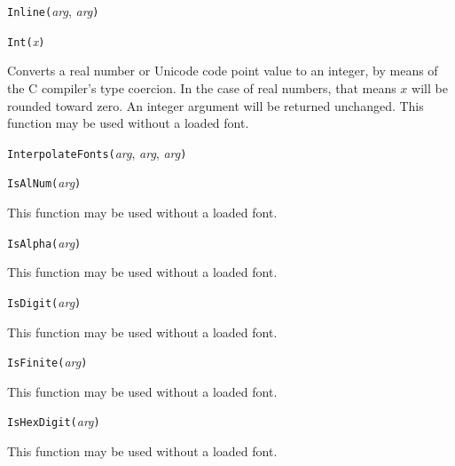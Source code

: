 
\texttt{Inline(}\textit{arg}, \textit{arg}\texttt{)}



\texttt{Int(}\textit{x}\texttt{)}

Converts a real number or Unicode code point value to an integer, by means
of the C compiler's type coercion.  In the case of real numbers, that means
$x$ will be rounded toward zero.  An integer argument will be returned
unchanged.
This function may be used without a loaded font.



\texttt{InterpolateFonts(}\textit{arg}, \textit{arg}, \textit{arg}\texttt{)}



\texttt{IsAlNum(}\textit{arg}\texttt{)}

This function may be used without a loaded font.



\texttt{IsAlpha(}\textit{arg}\texttt{)}

This function may be used without a loaded font.



\texttt{IsDigit(}\textit{arg}\texttt{)}

This function may be used without a loaded font.



\texttt{IsFinite(}\textit{arg}\texttt{)}

This function may be used without a loaded font.



\texttt{IsHexDigit(}\textit{arg}\texttt{)}

This function may be used without a loaded font.



